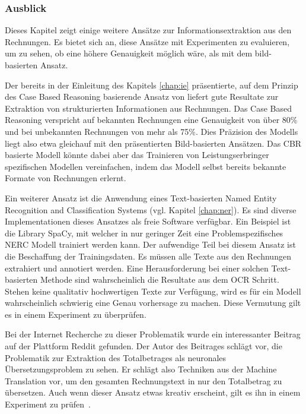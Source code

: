 \subsubsection{Ausblick}

Dieses Kapitel zeigt einige weitere Ansätze zur Informationsextraktion aus den Rechnungen. Es bietet sich an, diese Ansätze mit Experimenten zu evaluieren, um zu sehen, ob eine höhere Genauigkeit möglich wäre, als mit dem bild-basierten Ansatz.

Der bereits in der Einleitung des Kapitels \ref{chap:ie} präsentierte, auf dem Prinzip des Case Based Reasoning basierende Ansatz von \textcite{Hamza} liefert gute Resultate zur Extraktion von strukturierten Informationen aus Rechnungen. Das Case Based Reasoning verspricht auf bekannten Rechnungen eine Genauigkeit von über 80\% und bei unbekannten Rechnungen von mehr als 75\%. Dies Präzision des Modells liegt also etwa gleichauf mit den präsentierten Bild-basierten Ansätzen. Das CBR basierte Modell könnte dabei aber das Trainieren von Leistungserbringer spezifischen Modellen vereinfachen, indem das Modell selbst bereits bekannte Formate von Rechnungen erlernt.

Ein weiterer Ansatz ist die Anwendung eines Text-basierten Named Entity Recognition and Classification Systems (vgl. Kapitel \ref{chap:ner}). Es sind diverse Implementationen dieses Ansatzes als freie Software verfügbar. Ein Beispiel ist die Library SpaCy, mit welcher in nur geringer Zeit eine Problemspezifisches NERC Modell trainiert werden kann. Der aufwendige Teil bei diesem Ansatz ist die Beschaffung der Trainingsdaten. Es müssen alle Texte aus den Rechnungen extrahiert und annotiert werden. Eine Herausforderung bei einer solchen Text-basierten Methode sind wahrscheinlich die Resultate aus dem OCR Schritt. Stehen keine qualitativ hochwertigen Texte zur Verfügung, wird es für ein Modell wahrscheinlich schwierig eine Genau vorhersage zu machen. Diese Vermutung gilt es in einem Experiment zu überprüfen.

Bei der Internet Recherche zu dieser Problematik wurde ein interessanter Beitrag auf der Plattform Reddit gefunden. Der Autor des Beitrages schlägt vor, die Problematik zur Extraktion des Totalbetrages als neuronales Übersetzungsproblem zu sehen. Er schlägt also Techniken aus der Machine Translation vor, um den gesamten Rechnungstext in nur den Totalbetrag zu übersetzen. Auch wenn dieser Ansatz etwas kreativ erscheint, gilt es ihn in einem Experiment zu prüfen~\autocite{RedditIE}.

